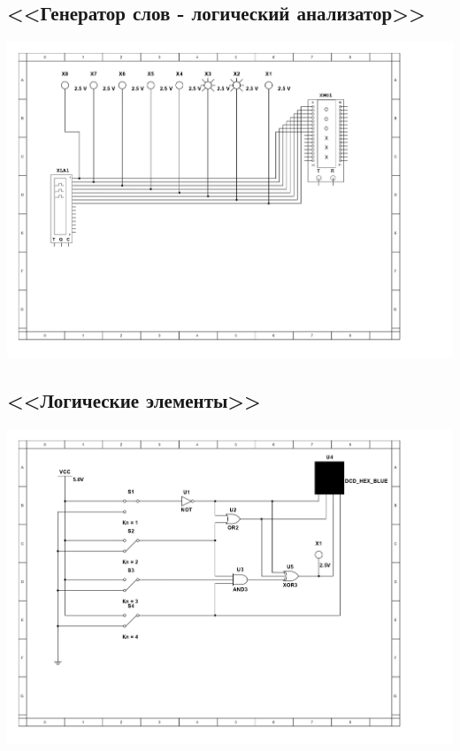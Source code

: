 \documentclass[11pt]{article}
\begin{document}
\subsection{<<Генератор слов - логический анализатор>>}
\includegraphics[width=1\linewidth]{3/scheme.jpg}
\subsection{<<Логические элементы>>}
\includegraphics[width=1\linewidth]{4/scheme.jpg}
\end{document}
